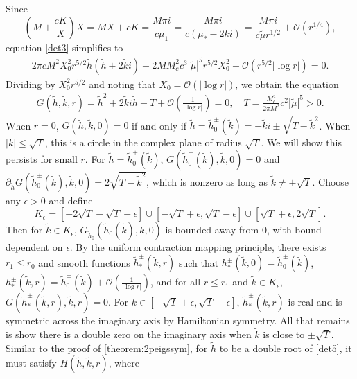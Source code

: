 \documentclass[12pt]{elsarticle}
\theoremstyle{plain}
\theoremstyle{definition}
\theoremstyle{remark}
\numberwithin{theorem}{section}
\numberwithin{equation}{section}
\begin{document}
Since
\[
\left( M + \frac{c K}{X} \right) X  = MX + c K = \frac{M \pi i}{c \mu_1} = \frac{M \pi i}{c(\mu_* - 2 k i)}
= \frac{M \pi i}{c \tilde{\mu}r^{1/2}} + \mathcal{O}(r^{1/4}),
\]
equation \cref{det3} simplifies to
\begin{equation}\label{det4}
\begin{aligned}
2 \pi c M^2 X_0^2 r^{5/2} \tilde{h}( \tilde{h} + 2 \tilde{k} i) - 2 M M_c^2 c^3 | \tilde{\mu}|^5 r^{5/2} X_0^2 + \mathcal{O}( r^{5/2} |\log r| ) = 0.
\end{aligned}
\end{equation}
Dividing by $X_0^2 r^{5/2}$ and noting that $X_0 = \mathcal{O}(|\log r|)$, we obtain the equation
\begin{equation}\label{det5}
\begin{aligned}
G(\tilde{h}, \tilde{k}, r) = \tilde{h}^2 + 2 \tilde{k}  i \tilde{h}
- T + \mathcal{O}\left( \frac{1}{|\log r|} \right) = 0, \quad T = \frac{M_c^2 }{2 \pi M^2 } c^2 |\tilde{\mu}|^5 > 0.
\end{aligned}
\end{equation}
When $r = 0$, $G(\tilde{h}, \tilde{k}, 0) = 0$ if and only if $\tilde{h} = \tilde{h}_0^\pm(\tilde{k}) = -\tilde{k}i \pm \sqrt{T - \tilde{k}^2}$. When $|k| \leq \sqrt{T}$, this is a circle in the complex plane of radius $\sqrt{T}$. We will show this persists for small $r$. For $\tilde{h} = \tilde{h}_0^\pm(\tilde{k})$, $G(\tilde{h}_0^\pm(\tilde{k}), \tilde{k}, 0) = 0$ and $\partial_{\tilde{h}}G(\tilde{h}_0^\pm(\tilde{k}), \tilde{k}, 0) = 2 \sqrt{T - \tilde{k}^2}$, which is nonzero as long as $\tilde{k} \neq \pm \sqrt{T}$. Choose any $\epsilon > 0$ and define
\[
K_\epsilon = [-2 \sqrt{T} -\sqrt{T} - \epsilon]
\cup [-\sqrt{T} + \epsilon, \sqrt{T} - \epsilon]
\cup [\sqrt{T} + \epsilon, 2\sqrt{T}].
\]
Then for $\tilde{k} \in K_\epsilon$, $G_{\tilde{h}_0}(\tilde{h}_0(\tilde{k}), \tilde{k}, 0)$ is bounded away from 0, with bound dependent on $\epsilon$. By the uniform contraction mapping principle, there exists $r_1 \leq r_0$ and smooth functions $\tilde{h}_*^\pm(\tilde{k}, r)$ such that $h_*^\pm(\tilde{k}, 0) = \tilde{h}_0^\pm(\tilde{k})$, $h_*^\pm(\tilde{k}, r) = \tilde{h}_0^\pm(\tilde{k}) + \mathcal{O}\left(\frac{1}{|\log r|}\right)$, and for all $r \leq r_1$ and $\tilde{k} \in K_\epsilon$, $G(\tilde{h}_*^\pm(\tilde{k},r),\tilde{k},r) = 0$. For $k \in [-\sqrt{T} + \epsilon, \sqrt{T} - \epsilon]$, $\tilde{h}_*^\pm(\tilde{k}, r)$ is real and is symmetric across the imaginary axis by Hamiltonian symmetry. All that remains is show there is a double zero on the imaginary axis when $\tilde{k}$ is close to $\pm \sqrt{T}$. Similar to the proof of \cref{theorem:2peigssym}, for $\tilde{h}$ to be a double root of \cref{det5}, it must satisfy $H(\tilde{h}, \tilde{k}, r)$, where
\end{document}
